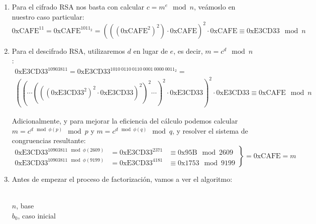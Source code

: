 	\begin{enumerate}
		\item Para el cifrado RSA nos basta con calcular $c = m^e \mod n$, veámoslo en nuestro caso particular:
		$$\mathrm{0xCAFE}^{11} = \mathrm{0xCAFE}^{1011_2} = \left(\left(\left(\mathrm{0xCAFE}^2\right)^2\right)
		\cdot \mathrm{0xCAFE}\right)^2 \cdot \mathrm{0xCAFE} \equiv \mathrm{0xE3CD33} \mod n$$
		
		\item Para el descifrado RSA, utilizaremos $d$ en lugar de $e$, es decir, $m = c^d \mod n$: \\
		\begin{gather*}
			\mathrm{0xE3CD33}^{10903811} = \mathrm{0xE3CD33}^{1010\ 0110\ 0110\ 0001\ 0000\ 0011_2} = \\
			\left(\left( \cdots \left(\left(\left(\mathrm{0xE3CD33}^2\right)^2 \cdot \mathrm{0xE3CD33}
			\right)^2\right)^2 \cdots \right)^2 \cdot \mathrm{0xE3CD33}\right)^2 \cdot \mathrm{0xE3CD33}
			\equiv \mathrm{0xCAFE} \mod n
		\end{gather*}
		
		Adicionalmente, y para mejorar la eficiencia del cálculo podemos calcular $m = c^{d \mod \phi(p)} \mod p$
		y $m = c^{d \mod \phi(q)} \mod q$, y resolver el sistema de congruencias resultante:
		$$\left.\begin{aligned}
		        \mathrm{0xE3CD33}^{10903811 \mod \phi(2609)} &= \mathrm{0xE3CD33}^{2371} &\equiv \mathrm{0x95B} \mod 2609\\
		        \mathrm{0xE3CD33}^{10903811 \mod \phi(9199)} &= \mathrm{0xE3CD33}^{4181} &\equiv \mathrm{0x1753} \mod 9199
		       \end{aligned}
		\right\} = \mathrm{0xCAFE} = m$$
		
		\item Antes de empezar el proceso de factorización, vamos a ver el algoritmo:
		
		\begin{algorithm}[H]
			\begin{algorithmic}[1]
				\REQUIRE \ \\
					\texttt{$n$}, base\\
					\texttt{$b_0$}, caso inicial\\ \
				\ENDWHILE
				

\end{algorithmic}
\end{algorithm}
\end{enumerate}
